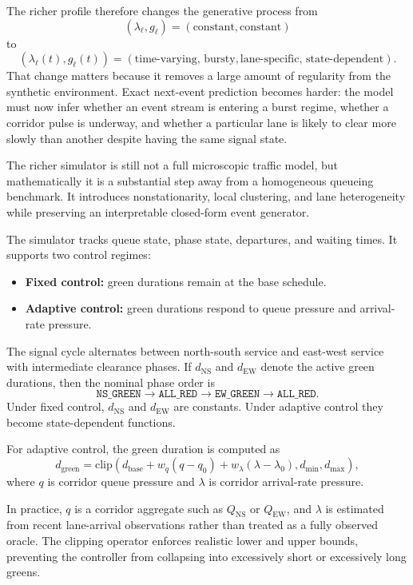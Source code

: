 \documentclass[11pt]{article}
\begin{document}
The richer profile therefore changes the generative process from
\[
(\lambda_\ell, g_\ell) = (\text{constant}, \text{constant})
\]
to
\[
(\lambda_\ell(t), g_\ell(t)) = (\text{time-varying, bursty}, \text{lane-specific, state-dependent}).
\]
That change matters because it removes a large amount of regularity from the synthetic environment. Exact next-event prediction becomes harder: the model must now infer whether an event stream is entering a burst regime, whether a corridor pulse is underway, and whether a particular lane is likely to clear more slowly than another despite having the same signal state.

The richer simulator is still not a full microscopic traffic model, but mathematically it is a substantial step away from a homogeneous queueing benchmark. It introduces nonstationarity, local clustering, and lane heterogeneity while preserving an interpretable closed-form event generator.

The simulator tracks queue state, phase state, departures, and waiting times. It supports two control regimes:

\begin{itemize}
  \item \textbf{Fixed control:} green durations remain at the base schedule.
  \item \textbf{Adaptive control:} green durations respond to queue pressure and arrival-rate pressure.
\end{itemize}

The signal cycle alternates between north-south service and east-west service with intermediate clearance phases. If \(d_{\mathrm{NS}}\) and \(d_{\mathrm{EW}}\) denote the active green durations, then the nominal phase order is
\[
\texttt{NS\_GREEN}
\rightarrow
\texttt{ALL\_RED}
\rightarrow
\texttt{EW\_GREEN}
\rightarrow
\texttt{ALL\_RED}.
\]
Under fixed control, \(d_{\mathrm{NS}}\) and \(d_{\mathrm{EW}}\) are constants. Under adaptive control they become state-dependent functions.

For adaptive control, the green duration is computed as
\[
d_{\mathrm{green}} =
\mathrm{clip}\left(
d_{\mathrm{base}} + w_q(q-q_0) + w_\lambda(\lambda-\lambda_0),
d_{\min}, d_{\max}
\right),
\]
where \(q\) is corridor queue pressure and \(\lambda\) is corridor arrival-rate pressure.

In practice, \(q\) is a corridor aggregate such as \(Q_{\mathrm{NS}}\) or \(Q_{\mathrm{EW}}\), and \(\lambda\) is estimated from recent lane-arrival observations rather than treated as a fully observed oracle. The clipping operator enforces realistic lower and upper bounds, preventing the controller from collapsing into excessively short or excessively long greens.
\end{document}
